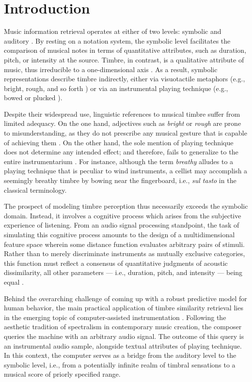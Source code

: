 \documentclass{bmcart}
\makeatletter
\newcommand*{\eg}{e.g.,\@\xspace}
\newcommand*{\ie}{i.e.,\@\xspace}
\makeatother
\begin{document}
\section*{Introduction}
\label{sec:intro}

Music information retrieval operates at either of two levels: symbolic and auditory \cite{downie2003mir}.
By resting on a notation system, the symbolic level facilitates the comparison of musical notes in terms of quantitative attributes, such as duration, pitch, or intensity at the source.
Timbre, in contrast, is a qualitative attribute of music, thus irreducible to a one-dimensional axis \cite{siedenburg2019chapter}.
As a result, symbolic representations describe timbre indirectly, either via visuotactile metaphors (\eg{} bright, rough, and so forth \cite{faure1996icmpc}) or via an instrumental playing technique (\eg{} bowed or plucked \cite{kostka2016book}).

Despite their widespread use, linguistic references to musical timbre suffer from limited adequacy.
On the one hand, adjectives such as \emph{bright} or \emph{rough} are prone to misunderstanding, as they do not prescribe any musical gesture that is capable of achieving them \cite{antoine2018isma}.
On the other hand, the sole mention of playing technique does not determine any intended effect; and therefore, fails to generalize to the entire instrumentarium \cite{kolozali2011ismir}.
For instance, although the term \emph{breathy} alludes to a playing technique that is peculiar to wind instruments, a cellist may accomplish a seemingly breathy timbre by bowing near the fingerboard, i.e., \emph{sul tasto} in the classical terminology.

The prospect of modeling timbre perception thus necessarily exceeds the symbolic domain.
Instead, it involves a cognitive process which arises from the subjective experience of listening. %
From an audio signal processing standpoint, the task of simulating this cognitive process amounts to the design of a multidimensional feature space wherein some distance function evaluates arbitrary pairs of stimuli.
Rather than to merely discriminate instruments as mutually exclusive categories, this function must reflect a consensus of quantitative judgments of acoustic dissimilarity, all other parameters --- \ie{} duration, pitch, and intensity --- being equal \cite{thoret2018jasa}.

Behind the overarching challenge of coming up with a robust predictive model for human behavior, the main practical application of timbre similarity retrieval lies in the emerging topic of computer-assisted instrumentation \cite{maresz2013cmr}.
Following the aesthetic tradition of spectralism in contemporary music creation, the composer queries the machine with an arbitrary audio signal.
The outcome of this query is an instrumental audio sample, alongside textual attributes of playing technique.
In this context, the computer serves as a bridge from the auditory level to the symbolic level, \ie{} from a potentially infinite realm of timbral sensations to a musical score of priorly specified range.
\end{document}
